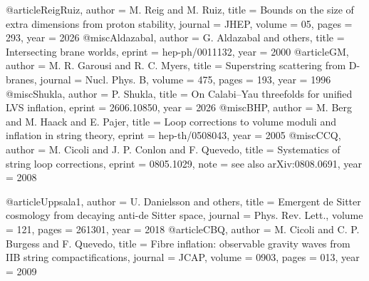 @article{ReigRuiz, author = {M. Reig and M. Ruiz}, title = {Bounds on the size of extra dimensions from proton stability}, journal = {JHEP}, volume = {05}, pages = {293}, year = {2026}}
@misc{Aldazabal, author = {G. Aldazabal and others}, title = {Intersecting brane worlds}, eprint = {hep-ph/0011132}, year = {2000}}
@article{GM, author = {M. R. Garousi and R. C. Myers}, title = {Superstring scattering from D-branes}, journal = {Nucl. Phys. B}, volume = {475}, pages = {193}, year = {1996}}
@misc{Shukla, author = {P. Shukla}, title = {On Calabi--Yau threefolds for unified LVS inflation}, eprint = {2606.10850}, year = {2026}}
@misc{BHP, author = {M. Berg and M. Haack and E. Pajer}, title = {Loop corrections to volume moduli and inflation in string theory}, eprint = {hep-th/0508043}, year = {2005}}
@misc{CCQ, author = {M. Cicoli and J. P. Conlon and F. Quevedo}, title = {Systematics of string loop corrections}, eprint = {0805.1029}, note = {see also arXiv:0808.0691}, year = {2008}}

@article{Uppsala1, author = {U. Danielsson and others}, title = {Emergent de Sitter cosmology from decaying anti-de Sitter space}, journal = {Phys. Rev. Lett.}, volume = {121}, pages = {261301}, year = {2018}}
@article{CBQ, author = {M. Cicoli and C. P. Burgess and F. Quevedo}, title = {Fibre inflation: observable gravity waves from IIB string compactifications}, journal = {JCAP}, volume = {0903}, pages = {013}, year = {2009}}